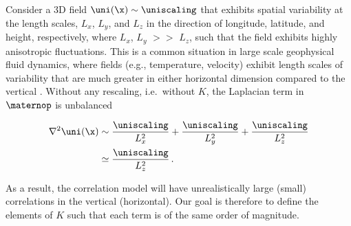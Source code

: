 \documentclass[alpha-refs]{wiley-article}
\begin{document}
Consider a 3D field $\uni(\x)\sim \uniscaling$ that exhibits spatial variability at the
length scales, $L_x$, $L_y$, and $L_z$ in the direction of longitude, latitude,
and height, respectively,
where $L_x$, $L_y$ $>>$ $L_z$, such that the field exhibits highly
anisotropic fluctuations.
This is a common situation in large scale geophysical fluid
dynamics, where fields (e.g., temperature, velocity) exhibit length scales of
variability that are much greater in either horizontal dimension compared to the
vertical \citep[e.g.,][]{vallis2006}.
Without any rescaling, i.e.\ without $K$,
the Laplacian term in $\maternop$ is unbalanced
\begin{linenomath*}\begin{equation}
    \begin{aligned}
        \nabla^2 \uni(\x)
            & \sim \dfrac{\uniscaling}{L_x^2} + \dfrac{\uniscaling}{L_y^2} + \dfrac{\uniscaling}{L_z^2} \\
            & \simeq \dfrac{\uniscaling}{L_z^2} \, .
    \end{aligned}
    \label{eq:iso_lap}
\end{equation}\end{linenomath*}
As a result, the correlation model will
have unrealistically large (small) correlations in the vertical (horizontal).
Our goal is therefore to define the elements of $K$ such that each term is of
the same order of magnitude.
\end{document}
